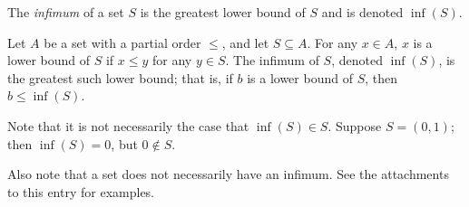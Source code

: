 \documentclass{article}
\begin{document}
The \emph{infimum} of a set $S$ is the greatest lower bound of $S$ and is denoted $\inf(S)$.

Let $A$ be a set with a partial order $\leq$, and let $S \subseteq A$.  For any $x \in A$, $x$ is a lower bound of $S$ if $x \leq y$ for any $y \in S$.  The  infimum of $S$, denoted $\inf(S)$, is the greatest such lower bound; that is, if $b$ is a lower bound of $S$, then $b \leq \inf(S)$.

Note that it is not necessarily the case that $\inf(S) \in S$.  Suppose $S = (0, 1)$; then $\inf(S) = 0$, but $0 \not\in S$.

Also note that a set does not necessarily have an infimum. See the attachments to this entry for examples.
\end{document}
